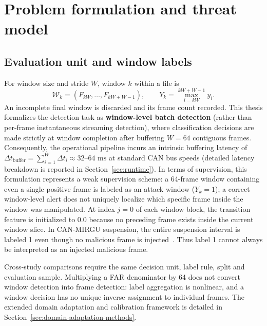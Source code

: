 \documentclass[12pt, a4paper, reqno, oneside]{book}
\begin{document}
\section{Problem formulation and threat model}
\subsection{Evaluation unit and window labels}
For window size and stride $W$, window $k$ within a file is
\begin{equation}
\mathcal W_k=(F_{kW},\ldots,F_{kW+W-1}),\qquad Y_k=\max_{i=kW}^{kW+W-1}y_i.
\end{equation}
An incomplete final window is discarded and its frame count recorded. This thesis formalizes the detection task as \textbf{window-level batch detection} (rather than per-frame instantaneous streaming detection), where classification decisions are made strictly at window completion after buffering $W=64$ contiguous frames. Consequently, the operational pipeline incurs an intrinsic buffering latency of $\Delta t_{\text{buffer}} = \sum_{i=1}^{W} \Delta t_i \approx 32\text{--}64\text{ ms}$ at standard CAN bus speeds (detailed latency breakdown is reported in Section~\ref{sec:runtime}). In terms of supervision, this formulation represents a weak supervision scheme: a 64-frame window containing even a single positive frame is labeled as an attack window ($Y_k = 1$); a correct window-level alert does not uniquely localize which specific frame inside the window was manipulated. At index $j=0$ of each window block, the transition feature is initialized to $0.0$ because no preceding frame exists inside the current window slice. In CAN-MIRGU suspension, the entire suspension interval is labeled 1 even though no malicious frame is injected~\cite{rajapaksha2024canmirgu}. Thus label 1 cannot always be interpreted as an injected malicious frame.

Cross-study comparisons require the same decision unit, label rule, split and evaluation sample. Multiplying a FAR denominator by 64 does not convert window detection into frame detection: label aggregation is nonlinear, and a window decision has no unique inverse assignment to individual frames. The extended domain adaptation and calibration framework is detailed in Section~\ref{sec:domain-adaptation-methods}.
\end{document}
